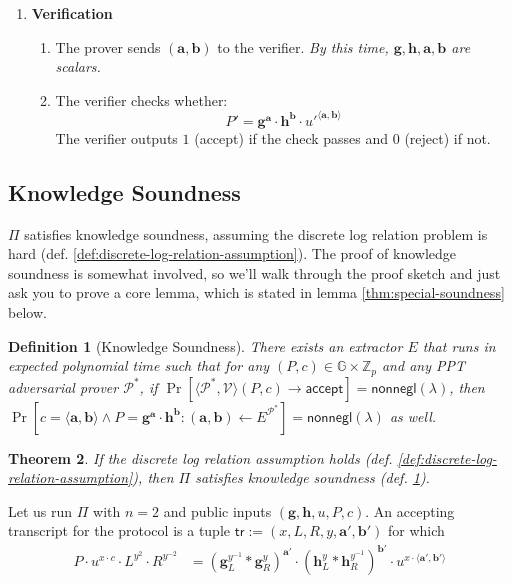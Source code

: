 \documentclass[11pt]{article}
\newtheorem{theorem}{Theorem}[section]
\newtheorem{definition}[theorem]{Definition}
\newcommand{\proofsketch}{\noindent{\bf Proof Sketch. }}
\numberwithin{equation}{section}
\newcommand{\bfa}{\mathbf{a}}
\newcommand{\bfb}{\mathbf{b}}
\newcommand{\bfg}{\mathbf{g}}
\newcommand{\bfh}{\mathbf{h}}
\newcommand{\bbG}{\mathbb{G}}
\newcommand{\bbZ}{\mathbb{Z}}
\newcommand{\cP}{\mathcal{P}}
\newcommand{\cV}{\mathcal{V}}
\newcommand{\tr}{\mathsf{tr}}
\newcommand{\secp}{\lambda}
\newcommand{\nonnegl}{\mathsf{nonnegl}}
\begin{document}
\begin{enumerate}
    \item \textbf{Verification}
    \begin{enumerate}
        \item The prover sends $(\bfa, \bfb)$ to the verifier. \textit{By this time, $\bfg, \bfh, \bfa, \bfb$ are scalars.}
        \item The verifier checks whether:
        \[P' = \bfg^\bfa \cdot \bfh^\bfb \cdot u'^{\langle \bfa, \bfb \rangle}\]
        The verifier outputs $1$ (accept) if the check passes and $0$ (reject) if not.
    \end{enumerate}
\end{enumerate}

\subsection{Knowledge Soundness}

$\Pi$ satisfies knowledge soundness, assuming the discrete log relation problem is hard (def. \ref{def:discrete-log-relation-assumption}). The proof of knowledge soundness is somewhat involved, so we'll walk through the proof sketch and just ask you to prove a core lemma, which is stated in lemma \ref{thm:special-soundness} below.

\begin{definition}[Knowledge Soundness]\label{def:knowledge-soundness}
    There exists an extractor $E$ that runs in expected polynomial time such that for any $(P, c) \in \bbG \times \bbZ_p$ and any PPT adversarial prover $\cP^*$, if $\Pr[\langle \cP^*, \cV \rangle(P, c) \to \mathsf{accept}] = \nonnegl(\secp)$, then $\Pr[c = \langle \bfa, \bfb \rangle \land P = \bfg^\bfa \cdot \bfh^\bfb : (\bfa, \bfb) \gets E^{\cP^*}] = \nonnegl(\secp)$ as well.
\end{definition}
\begin{theorem}
    If the discrete log relation assumption holds (def. \ref{def:discrete-log-relation-assumption}), then $\Pi$ satisfies knowledge soundness (def. \ref{def:knowledge-soundness}).
\end{theorem}
\proofsketch
Let us run $\Pi$ with $n=2$ and public inputs $(\bfg, \bfh, u, P, c)$. An accepting transcript for the protocol is a tuple $\tr := (x, L, R, y, \bfa', \bfb')$ for which
\begin{align*}
    P \cdot u^{x \cdot c} \cdot L^{y^2} \cdot R^{y^{-2}} &= \left(\bfg_L^{y^{-1}} * \bfg_R^{y}\right)^{\bfa'} \cdot \left(\bfh_L^{y} * \bfh_R^{y^{-1}}\right)^{\bfb'} \cdot u^{x \cdot \langle \bfa', \bfb'\rangle}
\end{align*}
\end{document}
